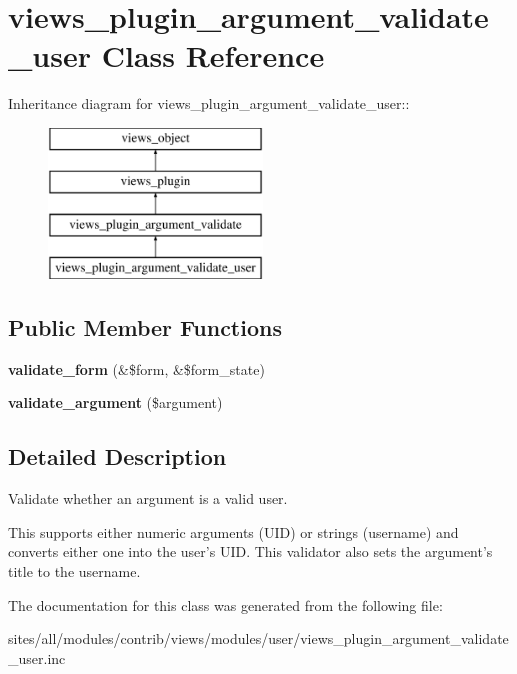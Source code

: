\hypertarget{classviews__plugin__argument__validate__user}{
\section{views\_\-plugin\_\-argument\_\-validate\_\-user Class Reference}
\label{classviews__plugin__argument__validate__user}
}
Inheritance diagram for views\_\-plugin\_\-argument\_\-validate\_\-user::\begin{figure}[H]
\begin{center}
\leavevmode
\includegraphics[height=4cm]{classviews__plugin__argument__validate__user}
\end{center}
\end{figure}
\subsection*{Public Member Functions}
\begin{CompactItemize}
\item 
\hypertarget{classviews__plugin__argument__validate__user_40987a3cb7e9670297529ea7738cc6f1}{
\textbf{validate\_\-form} (\&\$form, \&\$form\_\-state)}
\label{classviews__plugin__argument__validate__user_40987a3cb7e9670297529ea7738cc6f1}

\item 
\hypertarget{classviews__plugin__argument__validate__user_8b23a8f950ffebc871d59318eb839888}{
\textbf{validate\_\-argument} (\$argument)}
\label{classviews__plugin__argument__validate__user_8b23a8f950ffebc871d59318eb839888}

\end{CompactItemize}


\subsection{Detailed Description}
Validate whether an argument is a valid user.

This supports either numeric arguments (UID) or strings (username) and converts either one into the user's UID. This validator also sets the argument's title to the username. 

The documentation for this class was generated from the following file:\begin{CompactItemize}
\item 
sites/all/modules/contrib/views/modules/user/views\_\-plugin\_\-argument\_\-validate\_\-user.inc\end{CompactItemize}
